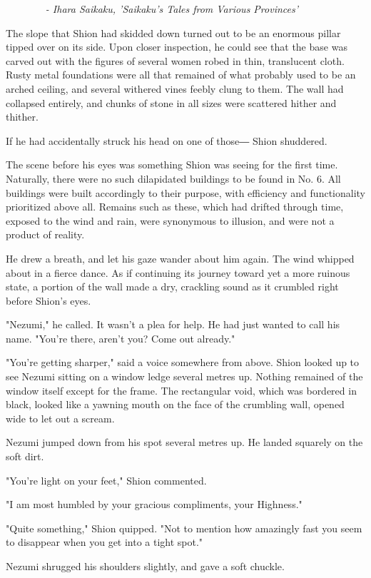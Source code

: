 \emph{~ ~ ~ ~ ~- Ihara Saikaku, 'Saikaku's Tales from Various
Provinces'}

The slope that Shion had skidded down turned out to be an enormous
pillar tipped over on its side. Upon closer inspection, he could see
that the base was carved out with the figures of several women robed in
thin, translucent cloth. Rusty metal foundations were all that remained
of what probably used to be an arched ceiling, and several withered
vines feebly clung to them. The wall had collapsed entirely, and chunks
of stone in all sizes were scattered hither and thither.

If he had accidentally struck his head on one of those― Shion shuddered.

The scene before his eyes was something Shion was seeing for the first
time. Naturally, there were no such dilapidated buildings to be found in
No. 6. All buildings were built accordingly to their purpose, with
efficiency and functionality prioritized above all. Remains such as
these, which had drifted through time, exposed to the wind and rain,
were synonymous to illusion, and were not a product of reality.

He drew a breath, and let his gaze wander about him again. The wind
whipped about in a fierce dance. As if continuing its journey toward yet
a more ruinous state, a portion of the wall made a dry, crackling sound
as it crumbled right before Shion's eyes.

"Nezumi," he called. It wasn't a plea for help. He had just wanted to
call his name. "You're there, aren't you? Come out already."

"You're getting sharper," said a voice somewhere from above. Shion
looked up to see Nezumi sitting on a window ledge several metres up.
Nothing remained of the window itself except for the frame. The
rectangular void, which was bordered in black, looked like a yawning
mouth on the face of the crumbling wall, opened wide to let out a
scream.

Nezumi jumped down from his spot several metres up. He landed squarely
on the soft dirt.

"You're light on your feet," Shion commented.

"I am most humbled by your gracious compliments, your Highness."

"Quite something," Shion quipped. "Not to mention how amazingly fast you
seem to disappear when you get into a tight spot."

Nezumi shrugged his shoulders slightly, and gave a soft chuckle.

